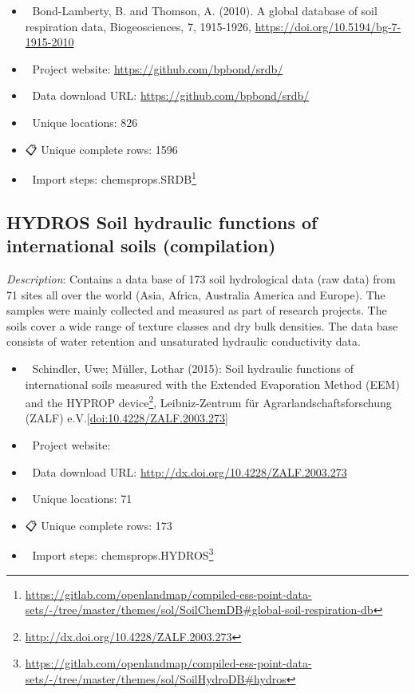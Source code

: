 \documentclass[
  graybox,natbib,nospthms]{svmono}
\providecommand{\tightlist}{%
  \setlength{\itemsep}{0pt}\setlength{\parskip}{0pt}}
\providecommand{\tightlist}{\setlength{\itemsep}{0pt}\setlength{\parskip}{0pt}}
\renewcommand{\href}[2]{#2 (\url{#1})}
\renewcommand{\href}[2]{#2\footnote{\url{#1}}}
\begin{document}
\begin{itemize}
\tightlist
\item
  📕 Bond-Lamberty, B. and Thomson, A. (2010). A global database of soil respiration data, Biogeosciences, 7, 1915-1926, \url{https://doi.org/10.5194/bg-7-1915-2010}\\
\item
  🔗 Project website: \url{https://github.com/bpbond/srdb/}\\
\item
  📂 Data download URL: \url{https://github.com/bpbond/srdb/}\\
\item
  📍 Unique locations: 826\\
\item
  📋 Unique complete rows: 1596\\
\item
  📝 Import steps: \href{https://gitlab.com/openlandmap/compiled-ess-point-data-sets/-/tree/master/themes/sol/SoilChemDB\#global-soil-respiration-db}{chemsprops.SRDB}
\end{itemize}

\hypertarget{hydros-soil-hydraulic-functions-of-international-soils-compilation}{%
\subsection{HYDROS Soil hydraulic functions of international soils (compilation)}\label{hydros-soil-hydraulic-functions-of-international-soils-compilation}}

\emph{Description}: Contains a data base of 173 soil hydrological data (raw data) from 71 sites all over the world (Asia, Africa, Australia America and Europe). The samples were mainly collected and measured as part of research projects. The soils cover a wide range of texture classes and dry bulk densities. The data base consists of water retention and unsaturated hydraulic conductivity data.

\begin{itemize}
\tightlist
\item
  📕 Schindler, Uwe; Müller, Lothar (2015): \href{http://dx.doi.org/10.4228/ZALF.2003.273}{Soil hydraulic functions of
  international soils measured with the Extended Evaporation Method (EEM) and the HYPROP device}, Leibniz-Zentrum für Agrarlandschaftsforschung (ZALF) e.V.{[}\url{doi:10.4228/ZALF.2003.273}{]}\\
\item
  🔗 Project website:\\
\item
  📂 Data download URL: \url{http://dx.doi.org/10.4228/ZALF.2003.273}\\
\item
  📍 Unique locations: 71\\
\item
  📋 Unique complete rows: 173\\
\item
  📝 Import steps: \href{https://gitlab.com/openlandmap/compiled-ess-point-data-sets/-/tree/master/themes/sol/SoilHydroDB\#hydros}{chemsprops.HYDROS}
\end{itemize}
\end{document}

